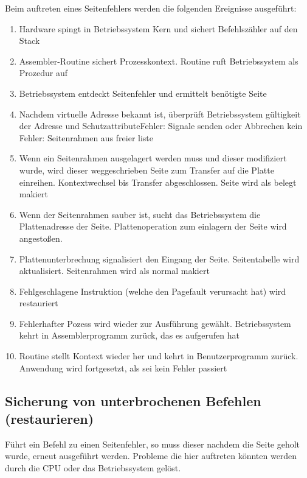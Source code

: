 Beim auftreten eines Seitenfehlers werden die folgenden Ereignisse aus\-ge\-führt:

\begin{enumerate}
    \item Hardware spingt in Betriebssystem Kern und sichert Befehlszähler auf den Stack
    \item Assembler-Routine sichert Prozesskontext. Routine ruft Be\-triebs\-sys\-tem als Prozedur auf
    \item Betriebssystem entdeckt Seitenfehler und ermittelt benötigte Seite
    \item Nachdem virtuelle Adresse bekannt ist, überprüft Betriebssystem gültigkeit der Adresse und Schutzattribute\newline Fehler: Signale senden oder Abbrechen \newline kein Fehler: Seitenrahmen aus freier liste
    \item Wenn ein Seitenrahmen ausgelagert werden muss und dieser modifiziert wurde, wird dieser weggeschrieben Seite zum Transfer auf die Platte einreihen. Kontextwechsel bis Transfer abgeschlossen. Seite wird als belegt makiert
    \item Wenn der Seitenrahmen sauber ist, sucht das Betriebssystem die Plattenadresse der Seite. Plattenoperation zum einlagern der Seite wird angestoßen. 
    \item Plattenunterbrechung signalisiert den Eingang der Seite. Seitentabelle wird aktualisiert. Seitenrahmen wird als normal makiert
    \item Fehlgeschlagene Instruktion (welche den Pagefault verursacht hat) wird restauriert
    \item Fehlerhafter Pozess wird wieder zur Ausführung gewählt. Betriebssystem kehrt in Assemblerprogramm zurück, das es aufgerufen hat
    \item Routine stellt Kontext wieder her und kehrt in Benutzerprogramm zurück. Anwendung wird fortgesetzt, als sei kein Fehler passiert
\end{enumerate}

\subsection{Sicherung von unterbrochenen Befehlen (restaurieren)}

Führt ein Befehl zu einen Seitenfehler, so muss dieser nachdem die Seite geholt wurde, erneut ausgeführt werden. Probleme die hier auftreten könnten werden durch die CPU oder das Betriebssystem gelöst.

